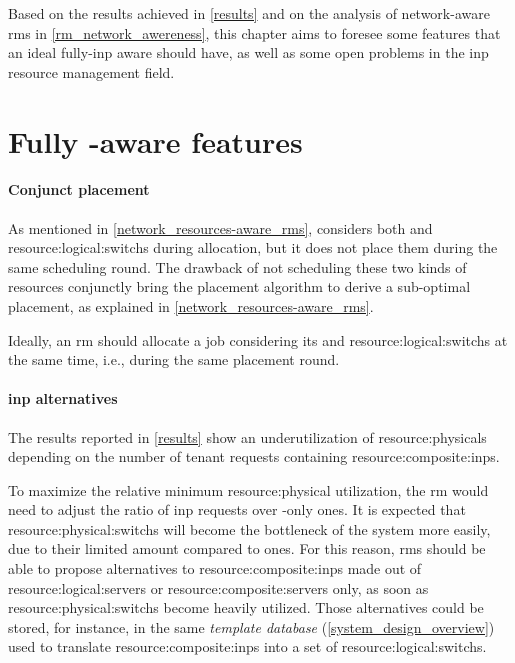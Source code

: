 Based on the results achieved in \autoref{results} and on the analysis of network-aware \glspl{rm} in \autoref{rm_network_awereness}, this chapter aims to foresee some features that an ideal fully-\gls{inp} aware should have, as well as some open problems in the \gls{inp} resource management field.

\section{Fully \texorpdfstring{}{INP}-aware \texorpdfstring{}{RM} features}

\paragraph{Conjunct placement}
As mentioned in \autoref{network_resources-aware_rms}, \cite{ontackling} considers both  and \glspl{resource:logical:switch} during allocation, but it does not place them during the same scheduling round.
The drawback of not scheduling these two kinds of resources conjunctly bring the placement algorithm to derive a sub-optimal placement, as explained in \autoref{network_resources-aware_rms}.

Ideally, an \gls{rm} should allocate a job considering its  and \glspl{resource:logical:switch} at the same time, i.e., during the same placement round.

\paragraph{\gls{inp} alternatives}
The results reported in \autoref{results} show an underutilization of \glspl{resource:physical} depending on the number of tenant requests containing \glspl{resource:composite:inp}.

To maximize the relative minimum \gls{resource:physical} utilization, the \gls{rm} would need to adjust the ratio of \gls{inp} requests over -only ones.
It is expected that \glspl{resource:physical:switch} will become the bottleneck of the system more easily, due to their limited amount compared to  ones.
For this reason, \glspl{rm} should be able to propose alternatives to \glspl{resource:composite:inp} made out of \glspl{resource:logical:server} or \glspl{resource:composite:server} only, as soon as \glspl{resource:physical:switch} become heavily utilized.
Those alternatives could be stored, for instance, in the same \textit{template database} (\autoref{system_design_overview}) used to translate \glspl{resource:composite:inp} into a set of \glspl{resource:logical:switch}.

